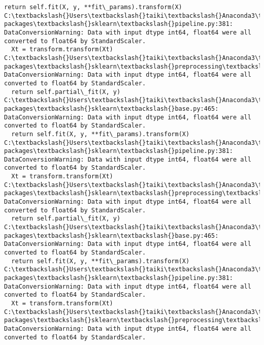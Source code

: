 \documentclass[a4j, dvipdfmx]{jsarticle}
\begin{document}
\begin{Verbatim}[commandchars=\\\{\}]
  return self.fit(X, y, **fit\_params).transform(X)
C:\textbackslash{}Users\textbackslash{}taiki\textbackslash{}Anaconda3\textbackslash{}Lib\textbackslash{}site-packages\textbackslash{}sklearn\textbackslash{}pipeline.py:381: DataConversionWarning: Data with input dtype int64, float64 were all converted to float64 by StandardScaler.
  Xt = transform.transform(Xt)
C:\textbackslash{}Users\textbackslash{}taiki\textbackslash{}Anaconda3\textbackslash{}Lib\textbackslash{}site-packages\textbackslash{}sklearn\textbackslash{}preprocessing\textbackslash{}data.py:625: DataConversionWarning: Data with input dtype int64, float64 were all converted to float64 by StandardScaler.
  return self.partial\_fit(X, y)
C:\textbackslash{}Users\textbackslash{}taiki\textbackslash{}Anaconda3\textbackslash{}Lib\textbackslash{}site-packages\textbackslash{}sklearn\textbackslash{}base.py:465: DataConversionWarning: Data with input dtype int64, float64 were all converted to float64 by StandardScaler.
  return self.fit(X, y, **fit\_params).transform(X)
C:\textbackslash{}Users\textbackslash{}taiki\textbackslash{}Anaconda3\textbackslash{}Lib\textbackslash{}site-packages\textbackslash{}sklearn\textbackslash{}pipeline.py:381: DataConversionWarning: Data with input dtype int64, float64 were all converted to float64 by StandardScaler.
  Xt = transform.transform(Xt)
C:\textbackslash{}Users\textbackslash{}taiki\textbackslash{}Anaconda3\textbackslash{}Lib\textbackslash{}site-packages\textbackslash{}sklearn\textbackslash{}preprocessing\textbackslash{}data.py:625: DataConversionWarning: Data with input dtype int64, float64 were all converted to float64 by StandardScaler.
  return self.partial\_fit(X, y)
C:\textbackslash{}Users\textbackslash{}taiki\textbackslash{}Anaconda3\textbackslash{}Lib\textbackslash{}site-packages\textbackslash{}sklearn\textbackslash{}base.py:465: DataConversionWarning: Data with input dtype int64, float64 were all converted to float64 by StandardScaler.
  return self.fit(X, y, **fit\_params).transform(X)
C:\textbackslash{}Users\textbackslash{}taiki\textbackslash{}Anaconda3\textbackslash{}Lib\textbackslash{}site-packages\textbackslash{}sklearn\textbackslash{}pipeline.py:381: DataConversionWarning: Data with input dtype int64, float64 were all converted to float64 by StandardScaler.
  Xt = transform.transform(Xt)
C:\textbackslash{}Users\textbackslash{}taiki\textbackslash{}Anaconda3\textbackslash{}Lib\textbackslash{}site-packages\textbackslash{}sklearn\textbackslash{}preprocessing\textbackslash{}data.py:625: DataConversionWarning: Data with input dtype int64, float64 were all converted to float64 by StandardScaler.

\end{Verbatim}
\end{document}
